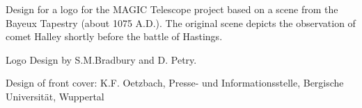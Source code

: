 \thispagestyle{empty}
\begin{figure}[h]
\leavevmode
\centering
\epsfxsize=15cm
\end{figure}
\noindent
Design for a logo for the MAGIC Telescope project based on
a scene from the Bayeux Tapestry (about 1075 A.D.). The 
original scene depicts the observation of comet Halley 
shortly before the battle of Hastings. 

\vfill

\noindent
{\tiny
Logo Design by S.M.Bradbury and D. Petry.}

\noindent
{\tiny
Design of front cover: K.F. Oetzbach, Presse- und Informationsstelle,
Bergische Universit\"at, Wuppertal}

\newpage

\thispagestyle{empty}

\begin{figure}[h]
\leavevmode
\centering
\epsfxsize=18cm
\vspace{3cm}
\end{figure}



